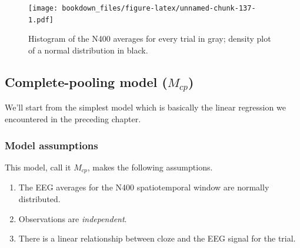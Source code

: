 \documentclass[12pt,]{krantz}
\newenvironment{Shaded}{\begin{snugshade}}{\end{snugshade}}
\newcommand{\DataTypeTok}[1]{\textcolor[rgb]{0.13,0.29,0.53}{#1}}
\newcommand{\DecValTok}[1]{\textcolor[rgb]{0.00,0.00,0.81}{#1}}
\newcommand{\FloatTok}[1]{\textcolor[rgb]{0.00,0.00,0.81}{#1}}
\newcommand{\KeywordTok}[1]{\textcolor[rgb]{0.13,0.29,0.53}{\textbf{#1}}}
\newcommand{\NormalTok}[1]{#1}
\newcommand{\OperatorTok}[1]{\textcolor[rgb]{0.81,0.36,0.00}{\textbf{#1}}}
\newcommand{\StringTok}[1]{\textcolor[rgb]{0.31,0.60,0.02}{#1}}
\providecommand{\tightlist}{%
  \setlength{\itemsep}{0pt}\setlength{\parskip}{0pt}}
\theoremstyle{definition}
\theoremstyle{definition}
\theoremstyle{definition}
\theoremstyle{remark}
\begin{document}
\begin{Shaded}
\end{Shaded}

\begin{figure}
\centering
\texttt{[image: bookdown\_files/figure-latex/unnamed-chunk-137-1.pdf]}
\caption{\label{fig:unnamed-chunk-137}Histogram of the N400 averages for every trial in gray; density plot of a normal distribution in black.}
\end{figure}

\hypertarget{complete-pooling-model-m_cp}{%
\subsection{\texorpdfstring{Complete-pooling model (\(M_{cp}\))}{Complete-pooling model (M\_\{cp\})}}\label{complete-pooling-model-m_cp}}

We'll start from the simplest model which is basically the linear regression we encountered in the preceding chapter.

\hypertarget{model-assumptions}{%
\subsubsection{Model assumptions}\label{model-assumptions}}

This model, call it \(M_{cp}\), makes the following assumptions.

\begin{enumerate}
\def\labelenumi{\arabic{enumi}.}
\tightlist
\item
  The EEG averages for the N400 spatiotemporal window are normally distributed.
\item
  Observations are \emph{independent}.
\item
  There is a linear relationship between cloze and the EEG signal for the trial.
\end{enumerate}
\end{document}
